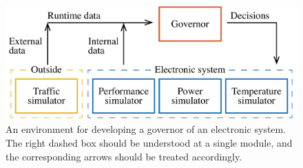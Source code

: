 \begin{figure}[b]
  \centering
  \includegraphics[width=1.0\columnwidth]{include/assets/figures/development.pdf}
  \caption{
    An environment for developing a governor of an electronic system. The right
    dashed box should be understood at a single module, and the corresponding
    arrows should be treated accordingly.
  }
\end{figure}
